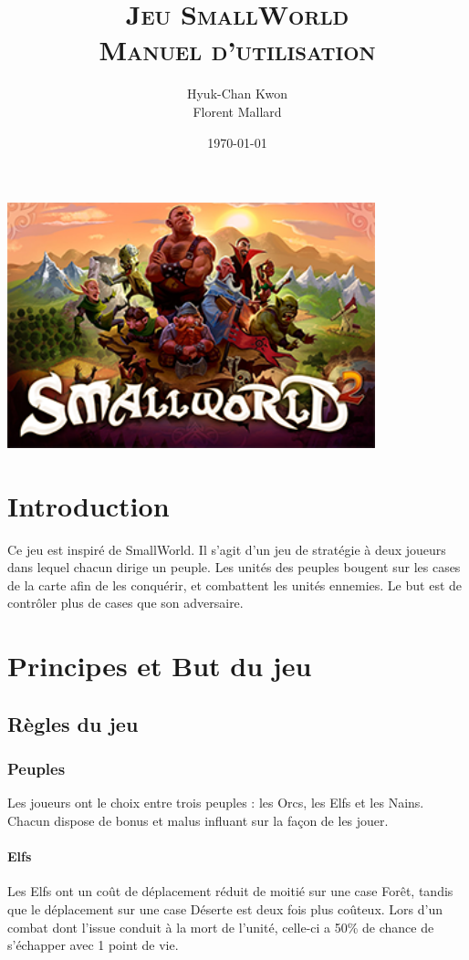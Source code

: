 \documentclass[a4paper]{article}
\title{
\textsc{Jeu SmallWorld\\
\LARGE Manuel d'utilisation}
}
\author
{
	Hyuk-Chan {\sc Kwon}\\
    Florent {\sc Mallard}\\
}
\date{\today}
\begin{document}
	\maketitle
	\begin{center}
		\includegraphics[width=0.8\textwidth]{../../IHM/textures/StartScreen.png}~\\[5cm]
	\end{center}

\newpage
\tableofcontents
\newpage

\section*{Introduction}
Ce jeu est inspiré de SmallWorld. Il s'agit d'un jeu de stratégie à deux joueurs dans lequel chacun dirige un peuple. Les unités des peuples bougent sur les cases de la carte afin de les conquérir, et combattent les unités ennemies. Le but est de contrôler plus de cases que son adversaire.\\

\section{Principes et But du jeu}
	\subsection{Règles du jeu}
		\subsubsection{Peuples}
		Les joueurs ont le choix entre trois peuples : les Orcs, les Elfs et les Nains. Chacun dispose de bonus et malus influant sur la façon de les jouer.

\paragraph{Elfs} Les Elfs ont un coût de déplacement réduit de moitié sur une case Forêt, tandis que le déplacement sur une case Déserte est deux fois plus coûteux. Lors d'un combat dont l'issue conduit à la mort de l'unité, celle-ci a 50\% de chance de s'échapper avec 1 point de vie.
\end{document}
